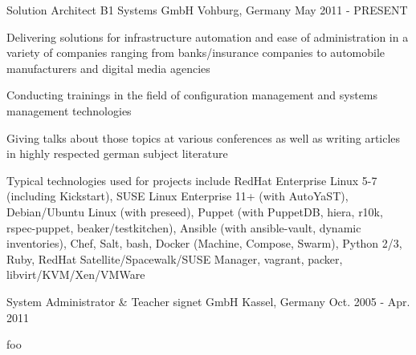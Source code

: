 \begin{cventries}

  \cventry
    {Solution Architect} %
    {B1 Systems GmbH} %
    {Vohburg, Germany} %
    {May 2011 - PRESENT} %
    {
      \begin{cvitems} %
        \item Delivering solutions for infrastructure automation and ease of administration in a variety of companies ranging from banks/insurance companies to automobile manufacturers and digital media agencies
        \item Conducting trainings in the field of configuration management and systems management technologies
        \item Giving talks about those topics at various conferences as well as writing articles in highly respected german subject literature
        \item Typical technologies used for projects include RedHat Enterprise Linux 5-7 (including Kickstart), SUSE Linux Enterprise 11+ (with AutoYaST), Debian/Ubuntu Linux (with preseed), Puppet (with PuppetDB, hiera, r10k, rspec-puppet, beaker/testkitchen), Ansible (with ansible-vault, dynamic inventories), Chef, Salt, bash, Docker (Machine, Compose, Swarm), Python 2/3, Ruby, RedHat Satellite/Spacewalk/SUSE Manager, vagrant, packer, libvirt/KVM/Xen/VMWare
      \end{cvitems}
    }

  \cventry
    {System Administrator \& Teacher} %
    {signet GmbH} %
    {Kassel, Germany} %
    {Oct. 2005 - Apr. 2011} %
    {
      \begin{cvitems} %
        \item foo
      \end{cvitems}
    }

\end{cventries}
